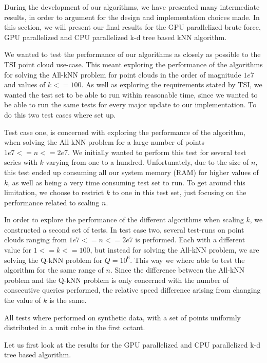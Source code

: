 

During the development of our algorithms, we have presented many intermediate results, in order to argument for the design and implementation choices made. In this section, we will present our final results for the GPU parallelized brute force, GPU parallelized and CPU parallelized k-d tree based kNN algorithm.

We wanted to test the performance of our algorithms as closely as possible to the TSI point cloud use-case. This meant exploring the performance of the algorithms for solving the All-kNN problem for point clouds in the order of magnitude $1e7$ and values of $k<=100$. As well as exploring the requirements stated by TSI, we wanted the test set to be able to run within reasonable time, since we wanted to be able to run the same tests for every major update to our implementation. To do this two test cases where set up.

Test case one, is concerned with exploring the performance of the algorithm, when solving the All-kNN problem for a large number of points $1e7<=n<=2e7$. We initially wanted to perform this test for several test series with $k$ varying from one to a hundred. Unfortunately, due to the size of $n$, this test ended up consuming all our system memory (RAM) for higher values of $k$, as well as being a very time consuming test set to run. To get around this limitation, we choose to restrict $k$ to one in this test set, just focusing on the performance related to scaling $n$.

In order to explore the performance of the different algorithms when scaling $k$, we constructed a second set of tests. In test case two, several test-runs on point clouds ranging from $1e7<=n<=2e7$ is performed. Each with a different value for $1<=k<=100$, but instead for solving the All-kNN problem, we are solving the Q-kNN problem for $Q=10^6$. This way we where able to test the algorithm for the same range of $n$. Since the difference between the All-kNN problem and the Q-kNN problem is only concerned with the number of consecutive queries performed, the relative speed difference arising from changing the value of $k$ is the same.

All tests where performed on synthetic data, with a set of points uniformly distributed in a unit cube in the first octant.

Let us first look at the results for the GPU parallelized and CPU parallelized k-d tree based algorithm.

